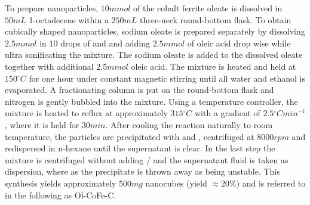 \documentclass[\main/dresen_thesis.tex]{subfiles}
\begin{document}
    To prepare nanoparticles, $10 \unit{mmol}$ of the cobalt ferrite oleate is dissolved in $50 \unit{mL}$ 1-octadecene within a $250 \unit{mL}$ three-neck round-bottom flask.
    To obtain cubically shaped nanoparticles, sodium oleate is prepared separately by dissolving $2.5 \unit{mmol}$  in $10$ drops of  and  and adding $2.5 \unit{mmol}$ of oleic acid drop wise while ultra sonificating the mixture.
    The sodium oleate is added to the dissolved oleate together with additional $2.5 \unit{mmol}$ oleic acid.
    The mixture is heated and held at $150 \unit{^\circ C}$ for one hour under constant magnetic stirring until all water and ethanol is evaporated.
    A fractionating column is put on the round-bottom flask and nitrogen is gently bubbled into the mixture.
    Using a temperature controller, the mixture is heated to reflux at approximately $315 \unit{^\circ C}$ with a gradient of $2.5 \unit{^\circ C min^{-1}}$, where it is held for $30 \unit{min}$.
    After cooling the reaction naturally to room temperature, the particles are precipitated with  and , centrifuged at $8000 \unit{rpm}$ and redispersed in n-hexane until the supernatant is clear.
    In the last step the mixture is centrifuged without adding / and the supernatant fluid is taken as dispersion, where as the precipitate is thrown away as being unstable.
    This synthesis yields approximately $500 \unit{mg}$ nanocubes (yield $\approx 20 \%$) and is referred to in the following as Ol-CoFe-C.
\end{document}
